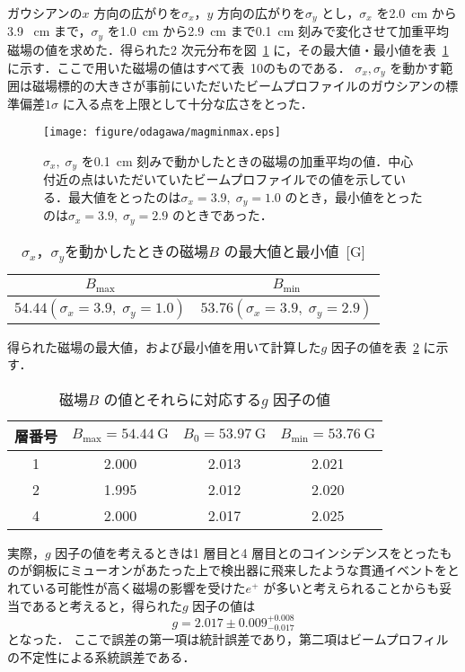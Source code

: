 ガウシアンの$x$ 方向の広がりを$\sigma_{x}$，$y$ 方向の広がりを$\sigma_{y}$ とし，$\sigma_{x}$ を2.0~cm から3.9 ~cm まで，$\sigma_{y}$ を1.0~cm から2.9~cm まで0.1~cm 刻みで変化させて加重平均磁場の値を求めた．得られた2 次元分布を図~\ref{fig:PSMagMinMax} に，その最大値・最小値を表~\ref{tab:MagSysErr} に示す．ここで用いた磁場の値はすべて表~10のものである．
$\sigma_{x}, \sigma_{y}$ を動かす範囲は磁場標的の大きさが事前にいただいたビームプロファイルのガウシアンの標準偏差$1\sigma$ に入る点を上限として十分な広さをとった．
\begin{figure}[h]
	\centering
	\texttt{[image: figure/odagawa/magminmax.eps]}
	\caption{$\sigma_{x}, \;\sigma_{y}$ を0.1~cm 刻みで動かしたときの磁場の加重平均の値．中心付近の点はいただいていたビームプロファイルでの値を示している．最大値をとったのは$\sigma_{x} = 3.9, \;\sigma_{y} = 1.0$ のとき，最小値をとったのは$\sigma_{x} = 3.9, \;\sigma_{y} = 2.9$ のときであった．}
	\label{fig:PSMagMinMax}
\end{figure}
\begin{table}[h]
	\centering
	\caption{$\sigma_{x}$，$\sigma_{y}$を動かしたときの磁場$B$ の最大値と最小値~[G]}
	\begin{tabular}{cc}\toprule
	$B_{\mathrm{max}}$ & $B_{\mathrm{min}}$ \\ \midrule
	$54.44 (\sigma_{x} = 3.9, \;\sigma_{y} = 1.0)$ & $53.76 (\sigma_{x} = 3.9, \;\sigma_{y} = 2.9)$ \\ \bottomrule 	
	\end{tabular}\label{tab:MagSysErr}
\end{table}%

得られた磁場の最大値，および最小値を用いて計算した$g$ 因子の値を表~\ref{tab:PSgSysErr} に示す．
\begin{table}[h]
	\centering
	\caption{磁場$B$ の値とそれらに対応する$g$ 因子の値}
	\begin{tabular}{cccc}\toprule
	層番号 & $B_{\mathrm{max}} = 54.44~\mathrm{G}$ & $B_{0} = 53.97~\mathrm{G}$ & $B_{\mathrm{min}} = 53.76~\mathrm{G}$ \\ \midrule
	1 & 2.000 & 2.013 & 2.021 \\
	2 & 1.995 & 2.012 & 2.020 \\
	4 & 2.000 & 2.017 & 2.025 \\ \bottomrule 
	\end{tabular}\label{tab:PSgSysErr}
\end{table}%

実際，$g$ 因子の値を考えるときは1 層目と4 層目とのコインシデンスをとったものが銅板にミューオンがあたった上で検出器に飛来したような貫通イベントをとれている可能性が高く磁場の影響を受けた$e^{+}$ が多いと考えられることからも妥当であると考えると，得られた$g$ 因子の値は
\[g = 2.017 \pm 0.009 ^{+0.008}_{-0.017}\]
となった．
ここで誤差の第一項は統計誤差であり，第二項はビームプロフィルの不定性による系統誤差である．


